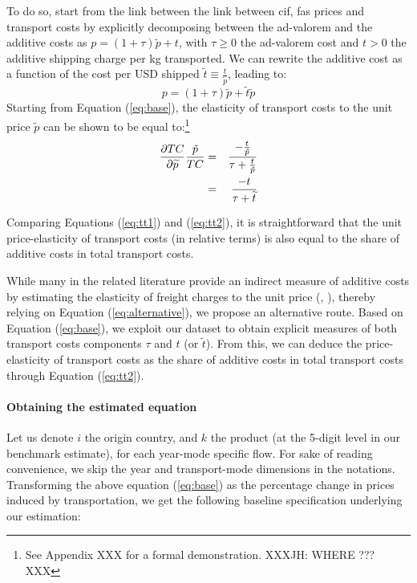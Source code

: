 \documentclass[a4paper,11pt]{article}
\begin{document}
To do so, start from the link between the link between cif, fas prices and transport costs by explicitly decomposing between the ad-valorem and the additive costs as $p = (1+\tau) \widetilde{p}+ t$, with $\tau \geq 0$ the ad-valorem cost and $t>0 $ the additive shipping charge per kg transported. We can rewrite the additive cost as a function of the cost per USD shipped $\widetilde{t} \equiv \frac{t}{\widetilde{p}}$, leading to:
\begin{equation}
p = (1+\tau) \widetilde{p}+ \widetilde{t}\widetilde{p}  \label{eq:base}
\end{equation}
Starting from Equation (\ref{eq:base}), the elasticity of transport costs to the unit price $\widetilde{p}$ can be shown to be equal to:\footnote{See Appendix XXX for a formal demonstration. XXXJH: WHERE ??? XXX}
\begin{eqnarray}
\frac{\partial TC}{\partial \widetilde{p}} \frac{\tilde{p}}{TC}&=& \frac{-\frac{t}{\tilde{p}}}{\tau   +\frac{t}{\tilde{p}}} \notag \\
&=& \frac{-t}{\tau +\widetilde{t}} \label{eq:tt2}
\end{eqnarray}

Comparing Equations (\ref{eq:tt1}) and (\ref{eq:tt2}), it is straightforward that the unit price-elasticity of transport costs (in relative terms) is also equal to the share of additive costs in total transport costs.

While many in the related literature provide an indirect measure of additive costs by estimating the elasticity of freight charges to the unit price (\citealp{hummels_skiba}, \citealp{Lashkaripour-2017}), thereby relying on Equation (\ref{eq:alternative}), we propose an alternative route. Based on Equation (\ref{eq:base}), we exploit our dataset to obtain explicit measures of both transport costs components $\tau$ and $t$ (or $\widetilde{t}$). From this, we can deduce the price-elasticity of transport costs as the share of additive costs in total transport costs through Equation (\ref{eq:tt2}).



\paragraph{Obtaining the estimated equation} Let us denote $i$ the origin country, and $k$ the product (at the 5-digit level in our benchmark estimate), for each year-mode specific flow. For sake of reading convenience, we skip the year and transport-mode dimensions in the notations. Transforming the above equation (\ref{eq:base}) as the percentage change in prices induced by transportation, we get the following baseline specification underlying our estimation:
\end{document}
